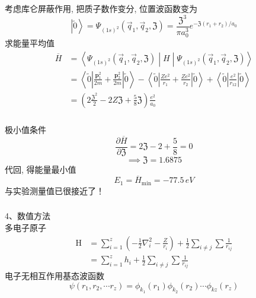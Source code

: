 \begin{frame}[label=current]
  \frametitle{}

考虑库仑屏蔽作用, 把质子数作变分, 位置波函数变为
\[ \left\vert \widetilde{0} \right\rangle = \Psi _{(1s)^2}(\vec{q}_1, \vec{q}_2, \mathfrak{Z} ) = \frac{\mathfrak{Z}^3}{\pi a_0^3} e^{-\mathfrak{Z}\left(r_1+r_2\right) / a_0} \]
求能量平均值
\[ \begin{aligned}
  \overline{H} &= \left\langle \Psi _{(1s)^2}(\vec{q}_1, \vec{q}_2, \mathfrak{Z} ) \middle| H \middle| \Psi _{(1s)^2}(\vec{q}_1, \vec{q}_2, \mathfrak{Z} ) \right\rangle \\
  &= \left\langle\widetilde{0}\left|\frac{\mathbf{p}_1^2}{2 m}+\frac{\mathbf{p}_2^2}{2 m}\right| \widetilde{0}\right\rangle-\left\langle\widetilde{0}\left|\frac{Z e^2}{r_1}+\frac{Z e^2}{r_2}\right| \widetilde{0}\right\rangle+\left\langle\widetilde{0}\left|\frac{e^2}{r_{12}}\right| \widetilde{0}\right\rangle \\
  &= \left( 2 \frac{\mathfrak{Z}^2}{2} - 2 Z \mathfrak{Z}+ \frac{5}{8} \mathfrak{Z} \right) \frac{e^2}{a_0}
\end{aligned} \]
\end{frame} 

\begin{frame}[label=current]
  \frametitle{}
极小值条件 
\[ \frac{\partial \overline{H} }{\partial \mathfrak{Z} } = 2 \mathfrak{Z} -2 + \frac{5}{8} = 0 \]
\[ \implies \mathfrak{Z} = 1.6875 \]
代回, 得能量最小值
\[ E_ 1 = \overline{H}_{\text{min}} = -77.5 \, eV \]
与实验测量值已很接近了！
\end{frame} 

\begin{frame}[label=current]
  \frametitle{}
4、数值方法 \\
多电子原子
\[ \begin{aligned}
  \mathrm{H} & =\sum_{i=1}^z\left(-\frac{1}{2} \nabla_i^2-\frac{Z}{r_i}\right)+\frac{1}{2} \sum_{i \neq j} \sum \frac{1}{r_{i j}} \\
  & =\sum_{i=1}^z h_i+\frac{1}{2} \sum_{i \neq j} \sum \frac{1}{r_{i j}}
  \end{aligned}\]
电子无相互作用基态波函数
$$
\psi\left(r_1, r_2, \cdots r_z\right)=\phi_{k_1}\left(r_1\right) \phi_{k_2}\left(r_2\right) \cdots \phi_{k z}\left(r_z\right)
$$
\end{frame} 

